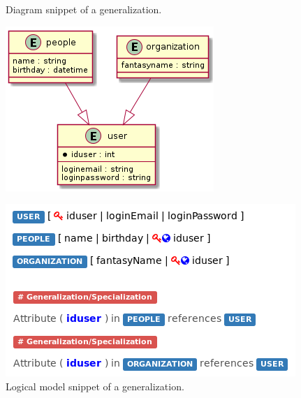 \begin{figure}[!htb]
  \centering
  \begin{minipage}[b]{0.4\textwidth}
    \caption{Diagram snippet of a generalization.}
    \includegraphics[width=\textwidth]{img/Diagram_Generalization.png}
    \label{fig:Diagram_Generalization}
  \end{minipage}
  \hfill
  \begin{minipage}[b]{0.5\textwidth}
    \caption{Logical model snippet of a generalization.}
    \label{fig:Logical_Generalization}
    \includegraphics[width=\textwidth]{img/Logical_Generalization.png}
  \end{minipage}
\end{figure}


